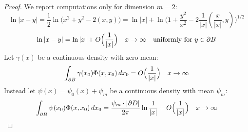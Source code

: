 \documentclass[10pt, a4paper, twoside, openright]{book}
\theoremstyle{definition}
\theoremstyle{plain}
\theoremstyle{plain}
\theoremstyle{plain}
\theoremstyle{plain}
\theoremstyle{plain}
\theoremstyle{plain}
\theoremstyle{plain}
\theoremstyle{plain}
\begin{document}
\begin{proof} We report computations only for dimension $m=2$:
 \begin{equation}
  \ln|x-y|=\frac{1}{2}\ln\Big(x^2 + y^2 - 2 (x,y)\Big) = \ln|x| + \ln\Big(1+\frac{y^2}{x^2}-2\frac{1}{|x|}(\frac{x}{|x|},y)\Big)^{1/2}
 \end{equation}
 \begin{equation}
  \ln|x-y|=\ln|x|+O\Bigl(\frac{1}{|x|}\Bigr) \quad x\to\infty\quad \text{uniformly for }y\in\partial B
 \end{equation}
 Let $\gamma(x)$ be a continuous density with zero mean:
 \begin{equation}
  \int_{\partial B}\gamma(x_0)\Phi(x,x_0)\, dx_0 = O\Bigl(\frac{1}{|x|}\Bigr)\quad x\to\infty
 \end{equation}
 Instead let $\psi(x)=\psi_0(x)+\psi_m$ be a continuous density with mean $\psi_m$:
 \begin{equation}
  \int_{\partial B}\psi(x_0)\Phi(x,x_0)\, dx_0 = \dfrac{\psi_m\cdot |\partial D|}{2\pi}\ln\dfrac{1}{|x|} + O\Bigl(\frac{1}{|x|}\Bigr)\quad x\to\infty
 \end{equation}
\end{proof}
\end{document}
